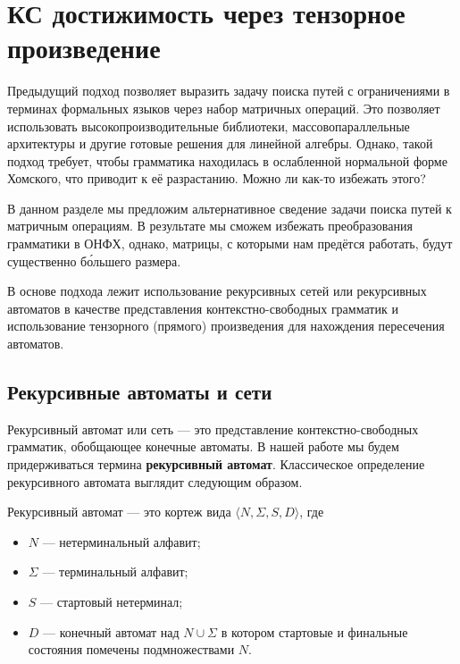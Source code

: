 \chapter{КС достижимость через тензорное произведение}

Предыдущий подход позволяет выразить задачу поиска путей с ограничениями в терминах формальных языков через набор матричных операций.
Это позволяет использовать высокопроизводительные библиотеки, массовопараллельные архитектуры и другие готовые решения для линейной алгебры.
Однако, такой подход требует, чтобы грамматика находилась в ослабленной нормальной форме Хомского, что приводит к её разрастанию.
Можно ли как-то избежать этого?

В данном разделе мы предложим альтернативное сведение задачи поиска путей к матричным операциям.
В результате мы сможем избежать преобразования грамматики в ОНФХ, однако, матрицы, с которыми нам предётся работать, будут существенно б\'{о}льшего размера.

В основе подхода лежит использование рекурсивных сетей или рекурсивных автоматов в качестве представления контекстно-свободных грамматик и использование тензорного (прямого) произведения для нахождения пересечения автоматов.

\section{Рекурсивные автоматы и сети}

Рекурсивный автомат или сеть --- это представление контекстно-свободных грамматик, обобщающее конечные автоматы.
В нашей работе мы будем придерживаться термина \textbf{рекурсивный автомат}.
Классическое определение рекурсивного автомата выглядит следующим образом.

\begin{definition}
Рекурсивный автомат --- это кортеж вида $\langle N, \Sigma, S, D \rangle$, где
\begin{itemize}
\item $N$ --- нетерминальный алфавит;
\item $\Sigma$ --- терминальный алфавит;
\item $S$ --- стартовый нетерминал;
\item $D$ --- конечный автомат над $N \cup \Sigma$ в котором стартовые и финальные состояния помечены подмножествами $N$.
\end{itemize}
\end{definition}



